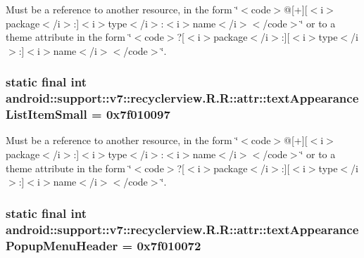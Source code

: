 Must be a reference to another resource, in the form \char`\"{}$<$code$>$@\mbox{[}+\mbox{]}\mbox{[}$<$i$>$package$<$/i$>$:\mbox{]}$<$i$>$type$<$/i$>$:$<$i$>$name$<$/i$>$$<$/code$>$\char`\"{} or to a theme attribute in the form \char`\"{}$<$code$>$?\mbox{[}$<$i$>$package$<$/i$>$:\mbox{]}\mbox{[}$<$i$>$type$<$/i$>$:\mbox{]}$<$i$>$name$<$/i$>$$<$/code$>$\char`\"{}. \hypertarget{classandroid_1_1support_1_1v7_1_1recyclerview_1_1_r_1_1attr_024d2152f9ff4f6650a507a33bb6f29b}{
\subsubsection[{textAppearanceListItemSmall}]{\setlength{\rightskip}{0pt plus 5cm}static final int android::support::v7::recyclerview.R.R::attr::textAppearanceListItemSmall = 0x7f010097}}
\label{classandroid_1_1support_1_1v7_1_1recyclerview_1_1_r_1_1attr_024d2152f9ff4f6650a507a33bb6f29b}


Must be a reference to another resource, in the form \char`\"{}$<$code$>$@\mbox{[}+\mbox{]}\mbox{[}$<$i$>$package$<$/i$>$:\mbox{]}$<$i$>$type$<$/i$>$:$<$i$>$name$<$/i$>$$<$/code$>$\char`\"{} or to a theme attribute in the form \char`\"{}$<$code$>$?\mbox{[}$<$i$>$package$<$/i$>$:\mbox{]}\mbox{[}$<$i$>$type$<$/i$>$:\mbox{]}$<$i$>$name$<$/i$>$$<$/code$>$\char`\"{}. \hypertarget{classandroid_1_1support_1_1v7_1_1recyclerview_1_1_r_1_1attr_4e280abe1f63d50e8aed4a91c3da17a3}{
\subsubsection[{textAppearancePopupMenuHeader}]{\setlength{\rightskip}{0pt plus 5cm}static final int android::support::v7::recyclerview.R.R::attr::textAppearancePopupMenuHeader = 0x7f010072}}
\label{classandroid_1_1support_1_1v7_1_1recyclerview_1_1_r_1_1attr_4e280abe1f63d50e8aed4a91c3da17a3}


